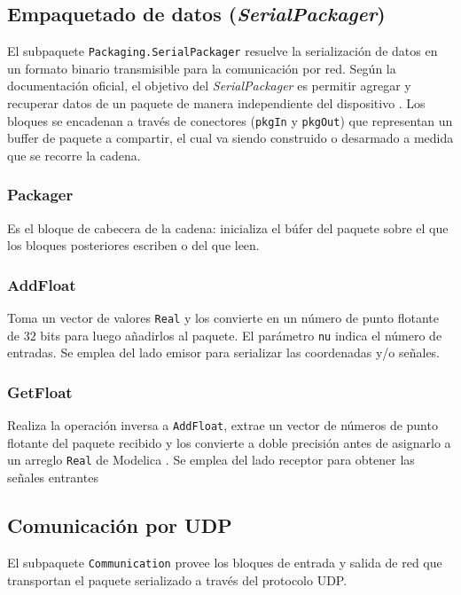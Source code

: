 \subsection*{Empaquetado de datos (\textit{SerialPackager})}

El subpaquete \verb|Packaging.SerialPackager| resuelve la serialización de datos en un formato binario transmisible para la comunicación por red. Según la documentación oficial, el objetivo del \textit{SerialPackager} es permitir agregar y recuperar datos de un paquete de manera independiente del dispositivo \cite{mdd}. Los bloques se encadenan a través de conectores (\verb|pkgIn| y \verb|pkgOut|) que representan un buffer de paquete a compartir, el cual va siendo construido o desarmado a medida que se recorre la cadena.


\subsubsection{Packager}
Es el bloque de cabecera de la cadena: inicializa el búfer del paquete sobre el que los bloques posteriores escriben o del que leen.

\subsubsection{AddFloat}

Toma un vector de valores \verb|Real| y los convierte en un número de punto flotante de $32$ bits para luego añadirlos al paquete. El parámetro \verb|nu| indica el número de entradas. Se emplea del lado emisor para serializar las coordenadas y/o señales.



\subsubsection{GetFloat} 
Realiza la operación inversa a \verb|AddFloat|, extrae un vector de números de punto flotante del paquete recibido y los convierte a doble precisión antes de asignarlo a un arreglo \verb|Real| de Modelica \cite{mdd}. Se emplea del lado receptor para obtener las señales entrantes

\subsection*{Comunicación por UDP}

El subpaquete \verb|Communication| provee los bloques de entrada y salida de red que transportan el paquete serializado a través del protocolo UDP.



